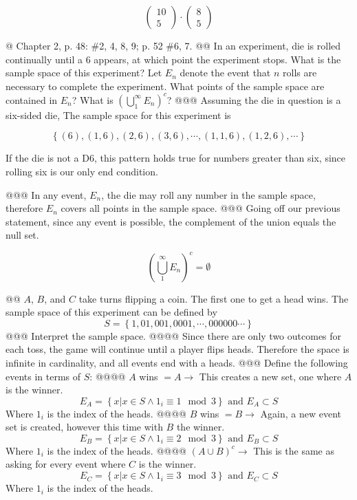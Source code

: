 \documentclass[10pt]{article}
\begin{document}
\begin{easylist}[enumerate]
    \[ \boxed{\begin{pmatrix}10\\5\end{pmatrix} \cdot \begin{pmatrix}8\\5\end{pmatrix}} \]

    @ Chapter 2, p. 48: \#2, 4, 8, 9; p. 52 \#6, 7.
    @@ In an experiment, die is rolled continually until a 6 appears, at which point the experiment stops. What is the sample space of this experiment? Let $E_n$ denote the event that $n$ rolls are necessary to complete the experiment. What points of the sample space are contained in $E_n$? What is ${\left( \bigcup^\infty_1 E_n \right)}^c$?
    @@@ Assuming the die in question is a six-sided die, The sample space for this experiment is

       \[ \left\{ (6), (1,6), (2, 6), (3, 6), \cdots, (1, 1, 6), (1, 2, 6), \cdots \right\} \]

       If the die is not a D6, this pattern holds true for numbers greater than six, since rolling six is our only end condition.

    @@@ In any event, $E_n$, the die may roll any number in the sample space, therefore $E_n$ covers all points in the sample space.
    @@@ Going off our previous statement, since any event is possible, the complement of the union equals the null set.

       \[{\left( \bigcup^\infty_1 E_n \right)}^c = \emptyset \]

    @@ $A$, $B$, and $C$ take turns flipping a coin. The first one to get a head wins. The sample space of this experiment can be defined by
       \[ S = \left\{ 1, 01, 001, 0001, \cdots, 000000\cdots \right\} \]
    @@@ Interpret the sample space.
    @@@@ Since there are only two outcomes for each toss, the game will continue until a player flips heads. Therefore the space is infinite in cardinality, and all events end with a heads.
    @@@ Define the following events in terms of $S$:
    @@@@ $A$ wins $ = A \to $ This creates a new set, one where $A$ is the winner.
       \[ E_A = \left\{ x | x \in S \wedge 1_i \equiv 1 \mod 3 \right\} \text{ and } E_A \subset S \]
       Where $1_i$ is the index of the heads.
    @@@@ $B$ wins $ = B \to$ Again, a new event set is created, however this time with $B$ the winner.
       \[ E_B = \left\{ x | x \in S \wedge 1_i \equiv 2 \mod 3 \right\} \text{ and } E_B \subset S \]
       Where $1_i$ is the index of the heads.
    @@@@ ${(A \cup B)}^c \to$ This is the same as asking for every event where $C$ is the winner.
       \[ E_C = \left\{ x | x \in S \wedge 1_i \equiv 3 \mod 3 \right\} \text{ and } E_C \subset S \]
       Where $1_i$ is the index of the heads.


\end{easylist}
\end{document}
